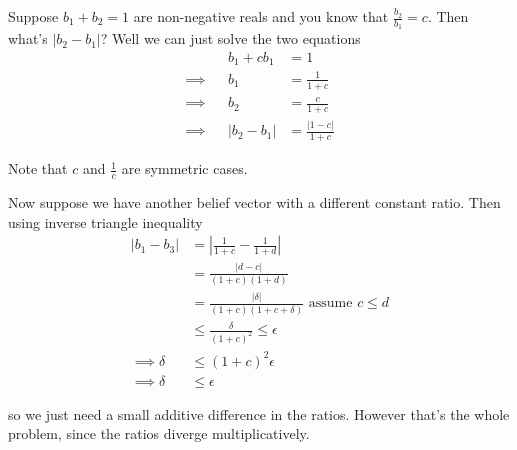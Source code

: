 \documentclass[10pt,english]{article}
\begin{document}
Suppose $b_1 + b_2 = 1$ are non-negative reals and you know that $\frac{b_2}{b_1} = c$. Then what's $|b_2 - b_1|$? Well we can just solve the two equations
\begin{align}
& & b_1 + cb_1 &= 1 \\
\implies & & b_1 &= \frac{1}{1+c} \\
\implies & & b_2 &= \frac{c}{1+c} \\
\implies & & |b_2 - b_1 |  &= \frac{|1-c|}{1+c}
\end{align}

Note that $c$ and $\frac{1}{c}$ are symmetric cases.

Now suppose we have another belief vector with a different constant ratio. Then using inverse triangle inequality
\begin{align}
|b_1 - b_3| &= \left| \frac{1}{1+c} - \frac{1}{1+d}\right| \\
&= \frac{|d-c|}{(1+c)(1+d)} \\
&= \frac{|\delta|}{(1+c)(1+c+\delta)} \text{ assume $c \leq d$}\\
&\leq \frac{\delta}{(1+c)^2} \leq \epsilon\\
\implies \delta &\leq (1+c)^2 \epsilon \\
\implies \delta &\leq \epsilon
\end{align}

so we just need a small additive difference in the ratios. However that's the whole problem, since the ratios diverge multiplicatively.
\end{document}
